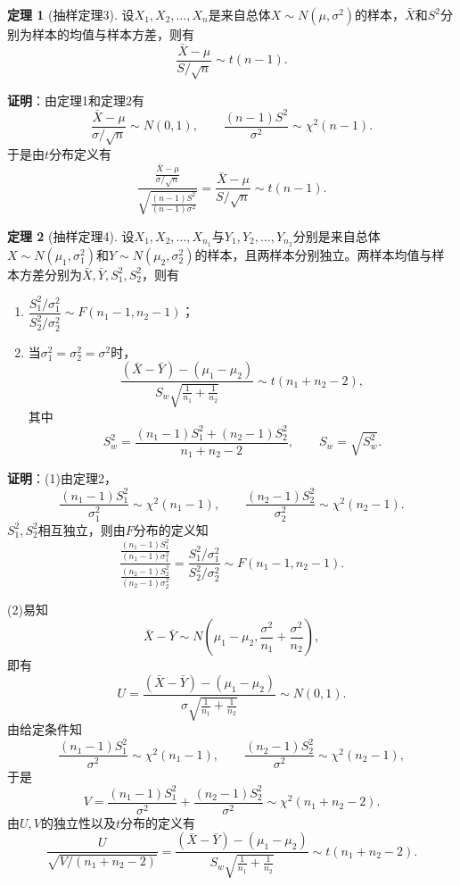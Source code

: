 \documentclass[11pt,a4paper]{report}
\theoremstyle{definition}
\newtheorem{theorem}{定理}[chapter]
\begin{document}
\begin{theorem}[抽样定理3]
设$X_{1},X_{2},\ldots,X_{n}$是来自总体$X\sim N(\mu,\sigma^{2})$的样本，$\bar{X}$和$S^{2}$分别为样本的均值与样本方差，则有
\[
\frac{\bar{X}-\mu}{S/\sqrt{n}}\sim t(n-1).
\]
\end{theorem}

\textbf{证明}：由定理1和定理2有
\[
\frac{\bar{X}-\mu}{\sigma/\sqrt{n}}\sim N(0,1),\qquad\frac{(n-1)S^{2}}{\sigma^{2}}\sim\chi^{2}(n-1).
\]
于是由$t$分布定义有
\[
\frac{\frac{\bar{X}-\mu}{\sigma/\sqrt{n}}}{\sqrt{\frac{(n-1)S^{2}}{(n-1)\sigma^{2}}}}=\frac{\bar{X}-\mu}{S/\sqrt{n}}\sim t(n-1).
\]

\begin{theorem}[抽样定理4]
设$X_{1},X_{2},\ldots,X_{n_{1}}$与$Y_{1},Y_{2},\ldots,Y_{n_{2}}$分别是来自总体$X\sim N(\mu_{1},\sigma_{1}^{2})$和$Y\sim N(\mu_{2},\sigma_{2}^{2})$的样本，且两样本分别独立。两样本均值与样本方差分别为$\bar{X},\bar{Y},S_{1}^{2},S_{2}^{2}$，则有
\begin{enumerate}[label=(\arabic*),leftmargin=2em]
    \item $\dfrac{S_{1}^{2}/\sigma_{1}^{2}}{S_{2}^{2}/\sigma_{2}^{2}}\sim F(n_{1}-1,n_{2}-1)$；
    \item 当$\sigma_{1}^{2}=\sigma_{2}^{2}=\sigma^{2}$时，
    \[
    \frac{(\bar{X}-\bar{Y})-(\mu_{1}-\mu_{2})}{S_{w}\sqrt{\frac{1}{n_{1}}+\frac{1}{n_{2}}}}\sim t(n_{1}+n_{2}-2),
    \]
    其中
    \[
    S_{w}^{2}=\frac{(n_{1}-1)S_{1}^{2}+(n_{2}-1)S_{2}^{2}}{n_{1}+n_{2}-2},\qquad S_{w}=\sqrt{S_{w}^{2}}.
    \]
\end{enumerate}
\end{theorem}

\textbf{证明}：(1)由定理2，
\[
\frac{(n_{1}-1)S_{1}^{2}}{\sigma_{1}^{2}}\sim\chi^{2}(n_{1}-1),\qquad\frac{(n_{2}-1)S_{2}^{2}}{\sigma_{2}^{2}}\sim\chi^{2}(n_{2}-1).
\]
$S_{1}^{2},S_{2}^{2}$相互独立，则由$F$分布的定义知
\[
\frac{\frac{(n_{1}-1)S_{1}^{2}}{(n_{1}-1)\sigma_{1}^{2}}}{\frac{(n_{2}-1)S_{2}^{2}}{(n_{2}-1)\sigma_{2}^{2}}}=\frac{S_{1}^{2}/\sigma_{1}^{2}}{S_{2}^{2}/\sigma_{2}^{2}}\sim F(n_{1}-1,n_{2}-1).
\]

(2)易知
\[
\bar{X}-\bar{Y}\sim N\left(\mu_{1}-\mu_{2},\frac{\sigma^{2}}{n_{1}}+\frac{\sigma^{2}}{n_{2}}\right),
\]
即有
\[
U=\frac{(\bar{X}-\bar{Y})-(\mu_{1}-\mu_{2})}{\sigma\sqrt{\frac{1}{n_{1}}+\frac{1}{n_{2}}}}\sim N(0,1).
\]
由给定条件知
\[
\frac{(n_{1}-1)S_{1}^{2}}{\sigma^{2}}\sim\chi^{2}(n_{1}-1),\qquad\frac{(n_{2}-1)S_{2}^{2}}{\sigma^{2}}\sim\chi^{2}(n_{2}-1),
\]
于是
\[
V=\frac{(n_{1}-1)S_{1}^{2}}{\sigma^{2}}+\frac{(n_{2}-1)S_{2}^{2}}{\sigma^{2}}\sim\chi^{2}(n_{1}+n_{2}-2).
\]
由$U,V$的独立性以及$t$分布的定义有
\[
\frac{U}{\sqrt{V/(n_{1}+n_{2}-2)}}=\frac{(\bar{X}-\bar{Y})-(\mu_{1}-\mu_{2})}{S_{w}\sqrt{\frac{1}{n_{1}}+\frac{1}{n_{2}}}}\sim t(n_{1}+n_{2}-2).
\]
\end{document}
